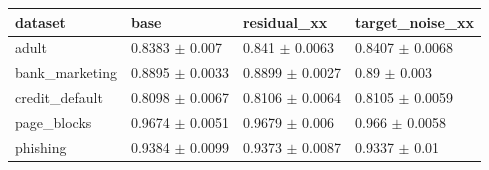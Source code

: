 \begin{tabular}{llll}
\toprule
dataset & base & residual\_xx & target\_noise\_xx \\
\midrule
adult & 0.8383 $\pm$ 0.007 & 0.841 $\pm$ 0.0063 & 0.8407 $\pm$ 0.0068 \\
bank\_marketing & 0.8895 $\pm$ 0.0033 & 0.8899 $\pm$ 0.0027 & 0.89 $\pm$ 0.003 \\
credit\_default & 0.8098 $\pm$ 0.0067 & 0.8106 $\pm$ 0.0064 & 0.8105 $\pm$ 0.0059 \\
page\_blocks & 0.9674 $\pm$ 0.0051 & 0.9679 $\pm$ 0.006 & 0.966 $\pm$ 0.0058 \\
phishing & 0.9384 $\pm$ 0.0099 & 0.9373 $\pm$ 0.0087 & 0.9337 $\pm$ 0.01 \\
\bottomrule
\end{tabular}
